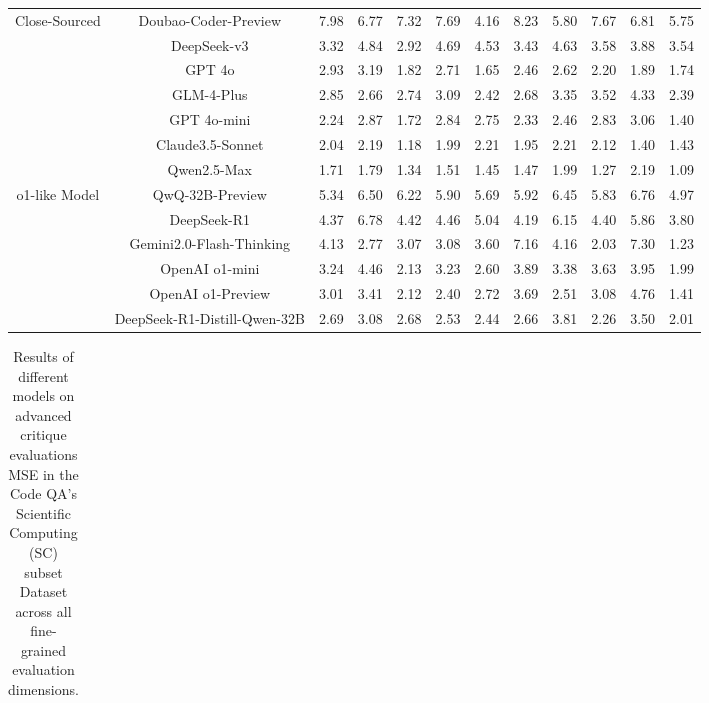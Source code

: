 \documentclass[11pt, a4paper, logo, copyright, nonumbering, amsart]{map}
\begin{document}
\begin{CJK*}{UTF8}{gbsn}
\begin{table*}[h!]
\begin{adjustbox}{width=\textwidth}
\begin{tabular}{c|c|cccccccccc}
    \midrule
    \multirow{7}{*}{Close-Sourced} 
    & Doubao-Coder-Preview & 7.98 & 6.77 & 7.32 & 7.69 & 4.16 & 8.23 & 5.80 & 7.67 & 6.81 & 5.75 \\
    & DeepSeek-v3 & 3.32 & 4.84 & 2.92 & 4.69 & 4.53 & 3.43 & 4.63 & 3.58 & 3.88 & 3.54 \\
    & GPT 4o & 2.93 & 3.19 & 1.82 & 2.71 & 1.65 & 2.46 & 2.62 & 2.20 & 1.89 & 1.74 \\
    & GLM-4-Plus & 2.85 & 2.66 & 2.74 & 3.09 & 2.42 & 2.68 & 3.35 & 3.52 & 4.33 & 2.39 \\
    & GPT 4o-mini & 2.24 & 2.87 & 1.72 & 2.84 & 2.75 & 2.33 & 2.46 & 2.83 & 3.06 & 1.40 \\
    & Claude3.5-Sonnet & 2.04 & 2.19 & 1.18 & 1.99 & 2.21 & 1.95 & 2.21 & 2.12 & 1.40 & 1.43 \\
    & Qwen2.5-Max & 1.71 & 1.79 & 1.34 & 1.51 & 1.45 & 1.47 & 1.99 & 1.27 & 2.19 & 1.09 \\
    
    \midrule
    \multirow{6}{*}{o1-like Model} 
    & QwQ-32B-Preview & 5.34 & 6.50 & 6.22 & 5.90 & 5.69 & 5.92 & 6.45 & 5.83 & 6.76 & 4.97 \\
    & DeepSeek-R1 & 4.37 & 6.78 & 4.42 & 4.46 & 5.04 & 4.19 & 6.15 & 4.40 & 5.86 & 3.80 \\
    & Gemini2.0-Flash-Thinking & 4.13 & 2.77 & 3.07 & 3.08 & 3.60 & 7.16 & 4.16 & 2.03 & 7.30 & 1.23 \\
    & OpenAI o1-mini & 3.24 & 4.46 & 2.13 & 3.23 & 2.60 & 3.89 & 3.38 & 3.63 & 3.95 & 1.99 \\
    & OpenAI o1-Preview & 3.01 & 3.41 & 2.12 & 2.40 & 2.72 & 3.69 & 2.51 & 3.08 & 4.76 & 1.41 \\
    & DeepSeek-R1-Distill-Qwen-32B & 2.69 & 3.08 & 2.68 & 2.53 & 2.44 & 2.66 & 3.81 & 2.26 & 3.50 & 2.01 \\
    \bottomrule
    \end{tabular}
    \end{adjustbox}
\end{table*}

\begin{table*}[h!]
    \centering
    \caption{Results of different models on advanced critique evaluations MSE in the Code QA's Scientific Computing (SC) subset Dataset across all fine-grained evaluation dimensions.} \label{table:real_level2_sc_dim}
    \begin{adjustbox}{width=\textwidth}
    \begin{tabular}{c|c|cccccccccc}
    

\end{tabular}
\end{adjustbox}
\end{table*}
\end{CJK*}
\end{document}
